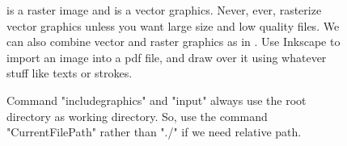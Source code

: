 \begin{figure}[htb]
  \centering
  
 {%
 is a raster image and  is a vector graphics.
Never, ever, rasterize vector graphics unless you want large size and low quality files.
We can also combine vector and raster graphics as in .
Use Inkscape to import an image into a pdf file, and draw over it using whatever stuff like texts or strokes.

Command "includegraphics" and "input" always use the root directory as working directory.
So, use the command "CurrentFilePath" rather than "./" if we need relative path.
 }
 \label{fig:example}
\end{figure}